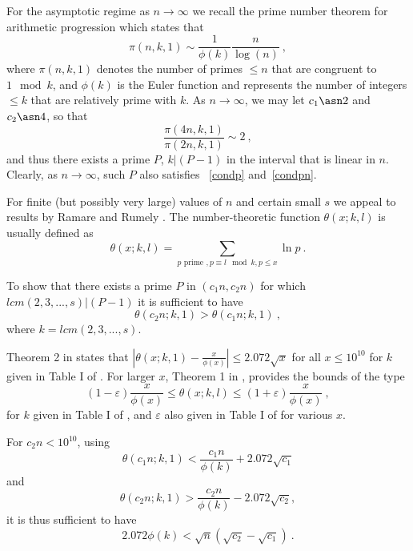 For the asymptotic regime as $n \rightarrow \infty$ we recall the
prime number theorem for arithmetic progression \cite{sopro} which
states that
\begin{equation}
\pi(n,k,1) \sim \frac{1}{\phi(k)} \frac{n}{\log(n)}~,
\end{equation}
where $\pi(n,k,1)$ denotes the number of primes $\leq n$ that are
congruent to $1 \mod k$, and $\phi(k)$ is the Euler function and
represents the number of integers $\leq k$ that are relatively
prime with $k$. As $n \rightarrow \infty$, we may let $c_1 \asn 2$
and $c_2 \asn 4$, so that
\begin{equation}
\frac{\pi(4n,k,1)}{\pi(2n,k,1)} \sim 2~,
\end{equation}
and thus there exists a prime $P$, $k | (P-1)$ in the interval
that is linear in $n$. Clearly, as $n \rightarrow \infty$, such
$P$ also satisfies ~\eqref{condp} and~\eqref{condpn}.



For finite (but possibly very large) values of $n$ and certain
small $s$ we appeal to results by Ramare and Rumely
\cite{rrumely}. The number-theoretic function $\theta(x;k,l)$ is
usually defined as
\[\theta(x;k,l)=\sum_{p \text{ prime }, p \equiv l \mod k, p
\leq x} \ln p~.\]

To show that there exists a prime $P$ in $(c_1n,c_2n)$ for which
$lcm(2,3,...,s) | (P-1)$  it is sufficient to have
\begin{equation} \theta(c_2n;k,1)> \theta(c_1n;k,1)~,\end{equation}
where $k=lcm(2,3,...,s)$.

Theorem 2 in \cite{rrumely} states that $|\theta(x;k,1)
-\frac{x}{\phi(x)}| \leq 2.072 \sqrt{x}$ for all $x \leq 10 ^{10}$
for $k$ given in Table I of \cite{rrumely}. For larger $x$,
Theorem 1 in \cite{rrumely}, provides the bounds of the type
\begin{equation}
(1-\varepsilon)\frac{x}{\phi(x)} \leq \theta(x;k,l) \leq
(1+\varepsilon)\frac{x}{\phi(x)}~,
\end{equation}
for $k$ given in Table I of \cite{rrumely}, and $\varepsilon$ also
given in Table I of \cite{rrumely} for various $x$.


For $c_2n < 10^{10}$, using \[\theta(c_1n;k,1) <
\frac{c_1n}{\phi(k)}+2.072\sqrt{c_1}
\]
and \[\theta(c_2n;k,1) > \frac{c_2n}{\phi(k)}-2.072\sqrt{c_2},
\]it is thus sufficient to have
\begin{equation}\label{cond1}
2.072\phi(k) < \sqrt{n}(\sqrt{c_2}-\sqrt{c_1})~.
\end{equation}


